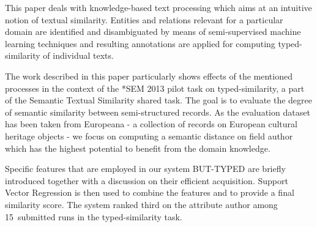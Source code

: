 This paper deals with knowledge-based text processing which aims at an intuitive notion of textual similarity. Entities and relations relevant for a
 particular domain are identified and disambiguated by means of semi-supervised
 machine learning techniques and resulting annotations are applied for computing
 typed-similarity of individual texts.
 
 The work described in this paper particularly shows effects of the mentioned
 processes in the context of the *SEM 2013 pilot task on typed-similarity, a
 part of the Semantic Textual Similarity shared task. The goal is to evaluate
 the degree of semantic similarity between semi-structured records. As the
 evaluation dataset has been taken from Europeana - a collection of records on
 European cultural heritage objects - we focus on computing a semantic distance
 on field author which has the highest potential to benefit from the domain
 knowledge.
 
 Specific features that are employed in our system BUT-TYPED are briefly
 introduced together with a discussion on their efficient acquisition. Support
 Vector Regression is then used to combine the features and to provide a final
 similarity score. The system ranked third on the attribute author among
 15~submitted runs in the typed-similarity task.


